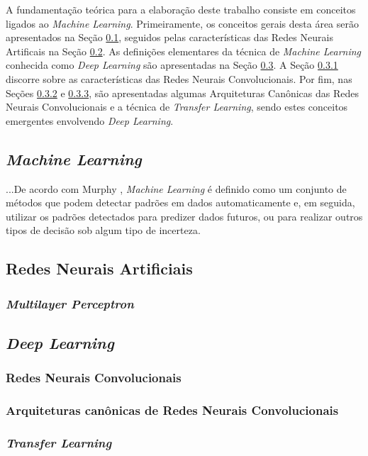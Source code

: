 A fundamentação teórica para a elaboração deste trabalho consiste em conceitos ligados ao \emph{Machine Learning}. Primeiramente, os conceitos gerais desta área serão apresentados na Seção \ref{subsec:ml}, seguidos pelas características das Redes Neurais Artificais na Seção \ref{subsec:rna}. As definições elementares da técnica de \emph{Machine Learning} conhecida como \emph{Deep Learning} são apresentadas na Seção \ref{subsec:dl}. A Seção \ref{subsubsec:cnns} discorre sobre as características das Redes Neurais Convolucionais. Por fim, nas Seções \ref{subsubsec:arq-cnns} e \ref{subsubsec:transfer}, são apresentadas algumas Arquiteturas Canônicas das Redes Neurais Convolucionais e a técnica de \emph{Transfer Learning}, sendo estes conceitos emergentes envolvendo \emph{Deep Learning}.


\subsection{\emph{Machine Learning}}
\label{subsec:ml}

...De acordo com Murphy \cite{murphy} , \emph{Machine Learning} é definido como um conjunto de métodos que podem detectar padrões em dados automaticamente e, em seguida, utilizar os padrões detectados para predizer dados futuros, ou para realizar outros tipos de decisão sob algum tipo de incerteza.



\subsection{Redes Neurais Artificiais}
\label{subsec:rna}

\subsubsection{\emph{Multilayer Perceptron}}
\label{subsubsec:mlp}


\subsection{\emph{Deep Learning}}
\label{subsec:dl}

\subsubsection{Redes Neurais Convolucionais}
\label{subsubsec:cnns}

\subsubsection{Arquiteturas canônicas de Redes Neurais Convolucionais}
\label{subsubsec:arq-cnns}

\subsubsection{\emph{Transfer Learning}}
\label{subsubsec:transfer}